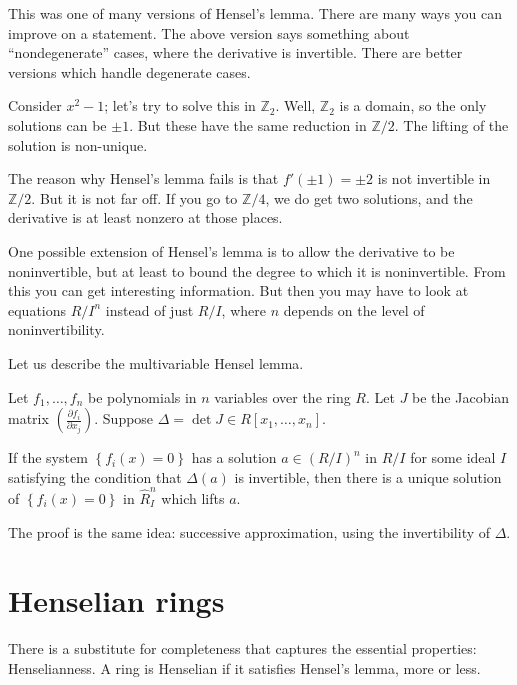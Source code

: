 This was one of many versions of Hensel's lemma. There are many ways you can
improve on a statement. The above version says something about
``nondegenerate'' cases, where the derivative is invertible. There are better
versions which handle degenerate cases.

\begin{example} 
Consider $x^2 - 1$; let's try to solve this in $\mathbb{Z}_2$. Well,
$\mathbb{Z}_2$ is a domain, so the only solutions can be $\pm 1$. But these
have the same reduction in $\mathbb{Z}/2$. The lifting of the solution is
non-unique.

The reason why Hensel's lemma fails is that $f'(\pm 1) = \pm 2$ is not
invertible in $\mathbb{Z}/2$. But it is not far off. If you go to
$\mathbb{Z}/4$, we do get two solutions, and the derivative is at least nonzero
at those places.
\end{example} 

One possible extension of Hensel's lemma is to allow the derivative to be
noninvertible, but at least to bound the degree to which it is noninvertible.
From this you can get interesting information. 
But then you may have to look at equations $R/I^n$ instead of just $R/I$, where
$n$ depends on the level of noninvertibility.

Let us describe the multivariable Hensel lemma.

\begin{theorem} 
Let $f_1, \dots, f_n$ be polynomials in $n$ variables over the ring $R$. Let
$J$ be the Jacobian matrix $( \frac{\partial f_i}{\partial x_j})$. Suppose
$\Delta = \det J \in R[x_1, \dots, x_n]$. 

If the system $\left\{f_i(x) = 0\right\}$ has a solution $a \in (R/I)^n$ in $R/I$ for some
ideal $I$ satisfying the condition that $\Delta(a)$ is invertible, then there
is a unique solution of $\left\{f_i(x) =0\right\}$ in $\hat{R}_I^n$ which lifts $a$. 
\end{theorem} 
The proof is the same idea: successive approximation, using the invertibility
of $\Delta$. 

\section{Henselian rings}



There is a substitute for completeness that captures the essential
properties: Henselianness. A ring is Henselian if it satisfies
Hensel's lemma, more or less.

